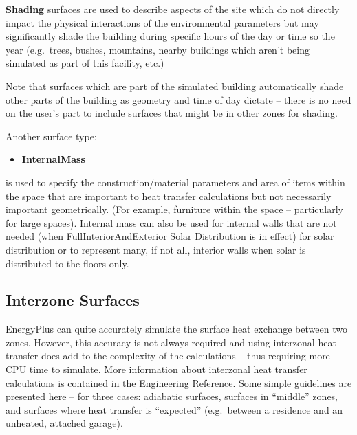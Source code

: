 \textbf{Shading} surfaces are used to describe aspects of the site which do not directly impact the physical interactions of the environmental parameters but may significantly shade the building during specific hours of the day or time so the year (e.g.~trees, bushes, mountains, nearby buildings which aren't being simulated as part of this facility, etc.)

\begin{callout}
Note that surfaces which are part of the simulated building automatically shade other parts of the building as geometry and time of day dictate -- there is no need on the user's part to include surfaces that might be in other zones for shading.
\end{callout}

Another surface type:

\begin{itemize}
\tightlist
\item
  \textbf{\hyperref[internalmass]{InternalMass}}
\end{itemize}

is used to specify the construction/material parameters and area of items within the space that are important to heat transfer calculations but not necessarily important geometrically. (For example, furniture within the space -- particularly for large spaces). Internal mass can also be used for internal walls that are not needed (when FullInteriorAndExterior Solar Distribution is in effect) for solar distribution or to represent many, if not all, interior walls when solar is distributed to the floors only.

\subsection{Interzone Surfaces}\label{interzone-surfaces}

EnergyPlus can quite accurately simulate the surface heat exchange between two zones. However, this accuracy is not always required and using interzonal heat transfer does add to the complexity of the calculations -- thus requiring more CPU time to simulate. More information about interzonal heat transfer calculations is contained in the Engineering Reference. Some simple guidelines are presented here -- for three cases: adiabatic surfaces, surfaces in ``middle'' zones, and surfaces where heat transfer is ``expected'' (e.g.~between a residence and an unheated, attached garage).

